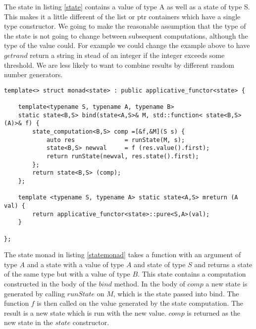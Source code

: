 \documentclass[12pt,fleqn]{article}
\begin{document}
The state in listing \ref{state} contains a value of type A as well as a state of type S.
This makes it a little different of the list or ptr containers which have a single type constructor.
We going to make the reasonable assumption that the type of the state is not going to change between subsequent computations, although the type of the
value could.
For example we could change the example above to have $getrand$ return a string in stead of an integer if the integer exceeds some threshold.
We are less likely to want to combine results by different random number generators.

\begin{lstlisting}[caption=state monad, label=statemonad]
template<> struct monad<state> : public applicative_functor<state> {

	template<typename S, typename A, typename B>
	static state<B,S> bind(state<A,S>& M, std::function< state<B,S> (A)>& f) {
		state_computation<B,S> comp =[&f,&M](S s) {
			auto res              = runState(M, s);
			state<B,S> newval     = f (res.value().first);
			return runState(newval, res.state().first);
		};
		return state<B,S> (comp);
	};

	template <typename S, typename A> static state<A,S> mreturn (A val) {
		return applicative_functor<state>::pure<S,A>(val);
	}

};
\end{lstlisting}

The state monad in listing \ref{statemonad} takes a function with an argument of type $A$ and a state with a value of type $A$ and state of type $S$ and 
returns a state of the same type but with a value of type $B$.
This state contains a computation constructed in the body of the $bind$ method.
In the body of $comp$ a new state is generated by calling $runState$ on $M$, which is the state passed into bind. 
The function $f$ is then called on the value generated by the state computation.
The result is a new state which is run with the new value.
$comp$ is returned as the new state in the $state$ constructor.
\end{document}
